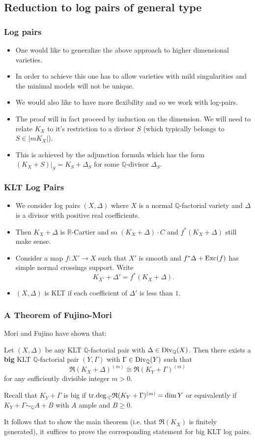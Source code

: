 \documentclass{beamer}
\theoremstyle{plain}
\theoremstyle{definition}
\theoremstyle{remark}
\def\Q{\mathbb {Q}}
\begin{document}
\subsection{Reduction to log pairs of general type}
\begin{frame}
 \frametitle{Log pairs}

\begin{itemize}
\item One would like to generalize the above approach to 
higher dimensional varieties.
\pause
\item In order to achieve this one has to allow varieties with mild singularities and the minimal models will not be unique.
\pause
\item We would also like to have more flexibility and so we work
with log-pairs.
\pause
\item The proof will in fact proceed by induction on the dimension.
We will need to relate $K_X$ to it's restriction to a divisor $S$ (which typically belongs to $S\in |mK_X|$).
\pause
\item This is achieved by the adjunction formula which has the form
$(K_X+S)|_S=K_S+\Delta _S$ for some $\Q$-divisor $\Delta _S$. 
\end{itemize}
\end{frame}
\begin{frame}
 \frametitle{KLT Log Pairs}
\begin{itemize}
\item We consider log pairs $(X,\Delta )$ where $X$ is a normal $\Q$-factorial variety and $\Delta$ is a divisor with positive real coefficients.
\pause
\item Then $K_X+\Delta$ is $\mathbb{R}$-Cartier and so $(K_X+\Delta )\cdot C$ and
$f^*(K_X+\Delta )$ still make sense.
\pause
\item Consider a map $f:X'\to X$ such that $X'$ is smooth and $f^* \Delta +{\rm Exc}(f)$ has simple normal crossings support.
Write $$K_{X'}+\Delta '=f^*(K_X+\Delta ).$$
\pause
\item $(X,\Delta )$ is KLT if each coefficient of $\Delta '$ is less than $1$.
\end{itemize}
\end{frame}
\begin{frame}
 \frametitle{A Theorem of Fujino-Mori}
Mori and Fujino have shown that:
\begin{theorem} Let $(X,\Delta )$ be any KLT $\Q$-factorial pair with 
$\Delta \in {\rm Div }_\Q (X)$. Then there exists a {\bf big} KLT $\Q$-factorial 
pair $(Y,\Gamma )$ with $\Gamma \in {\rm Div }_\Q (Y)$ such that
$$\mathfrak{R}(K_X+\Delta )^{(m)}\cong \mathfrak{R}(K_Y+\Gamma )^{(m)}$$
for any sufficiently divisible integer $m>0$.
\end{theorem}
\pause
Recall that $K_Y+\Gamma$ is big if ${\rm tr.deg.}_{\mathbb C}\mathfrak{R}(K_Y+\Gamma )^{(m)}=\dim Y$ or equivalently if $K_Y+\Gamma\sim _\Q A+B$ with $A$ ample and $B\geq 0$.

\pause
It follows that to show the main theorem (i.e. that $\mathfrak{R}(K_X)$ 
is finitely generated), it suffices to prove the corresponding statement 
for big KLT log pairs.
\end{frame}
\end{document}
